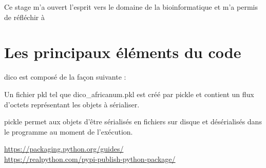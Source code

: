 \documentclass[twoside,a4paper,11pt,frenchb,openany]{report}
\begin{document}
Ce stage m'a ouvert l'esprit vers le domaine de la bioinformatique et m'a permis de réfléchir à 

	
	

	


\section{Les principaux éléments du code}

dico est composé de la façon suivante :

Un fichier pkl tel que dico\_africanum.pkl est créé par pickle et contient un flux d'octets représentant les objets à sérialiser.

pickle permet aux objets d'être sérialisés en fichiers sur disque et désérialisés dans le programme au moment de l'exécution.
	
	\begin{spacing}{0.5}
		
		\renewcommand{\bibname}{Références}
		\begin{thebibliography}{10}
			\href{https://packaging.python.org/guides/}{https://packaging.python.org/guides/}\\

\href{https://realpython.com/pypi-publish-python-package/}{https://realpython.com/pypi-publish-python-package/}
			
		\end{thebibliography}
	\end{spacing}



\printindex
\end{document}

